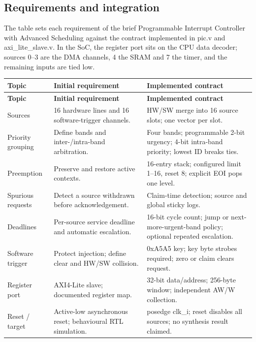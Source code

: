 \documentclass[11pt]{article}
\begin{document}
\subsection{Requirements and integration}
\noindent The table sets each requirement of the brief Programmable Interrupt Controller with Advanced Scheduling against the contract implemented in pic.v and axi\_lite\_slave.v. In the SoC, the register port sits on the CPU data decoder; sources 0–3 are the DMA channels, 4 the SRAM and 7 the timer, and the remaining inputs are tied low.\par\medskip
{\small
\begin{longtable}{@{}L{0.1500\dimexpr\linewidth-24pt\relax}L{0.3500\dimexpr\linewidth-24pt\relax}L{0.5000\dimexpr\linewidth-24pt\relax}@{}}
\toprule
\textbf{Topic} & \textbf{Initial requirement} & \textbf{Implemented contract} \\ \midrule
\endfirsthead
\toprule
\textbf{Topic} & \textbf{Initial requirement} & \textbf{Implemented contract} \\ \midrule
\endhead
Sources & 16 hardware lines and 16 software-trigger channels. & HW/SW merge into 16 source slots; one vector per slot. \\ \addlinespace[3pt]
Priority grouping & Define bands and inter-/intra-band arbitration. & Four bands; programmable 2-bit urgency; 4-bit intra-band priority; lowest ID breaks ties. \\ \addlinespace[3pt]
Preemption & Preserve and restore active contexts. & 16-entry stack; configured limit 1–16, reset 8; explicit EOI pops one level. \\ \addlinespace[3pt]
Spurious requests & Detect a source withdrawn before acknowledgement. & Claim-time detection; source and global sticky logs. \\ \addlinespace[3pt]
Deadlines & Per-source service deadline and automatic escalation. & 16-bit cycle count; jump or next-more-urgent-band policy; optional repeated escalation. \\ \addlinespace[3pt]
Software trigger & Protect injection; define clear and HW/SW collision. & 0xA5A5 key; key byte strobes required; zero or claim clears request. \\ \addlinespace[3pt]
Register port & AXI4-Lite slave; documented register map. & 32-bit data/address; 256-byte window; independent AW/W collection. \\ \addlinespace[3pt]
Reset / target & Active-low asynchronous reset; behavioural RTL simulation. & posedge clk\_i; reset disables all sources; no synthesis result claimed. \\*
\bottomrule\end{longtable}}
\end{document}
